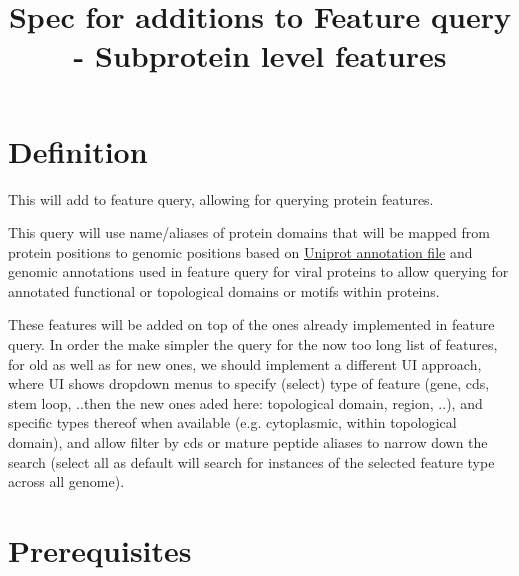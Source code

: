 \documentclass[a4paper, 10pt]{article}
\title{Spec for additions to Feature query - Subprotein level features}
\begin{document}
\date{}
\maketitle




\section{Definition}
This will add to feature query, allowing for querying protein features.

This query will use name/aliases of protein domains that will be mapped from protein positions to genomic positions based on \href{https://github.com/clauw87/virusbeacon/blob/raw_ideas/uniprot-2697049.gff}{Uniprot annotation file} and genomic annotations used in feature query for viral proteins to allow querying for annotated functional or topological domains or motifs within proteins. 

These features will be added on top of the ones already implemented in feature query. In order the make simpler the query for the now too long list of features, for old as well as for new ones, we should implement a different UI approach, where UI shows dropdown menus to specify (select) type of feature (gene, cds, stem loop, ..then the new ones aded here: topological domain, region, ..), and specific types thereof when available (e.g. cytoplasmic, within topological domain), and allow filter by cds or mature peptide aliases to narrow down the search (select all as default will search for instances of the selected feature type across all genome). 


\section{Prerequisites}
\end{document}
